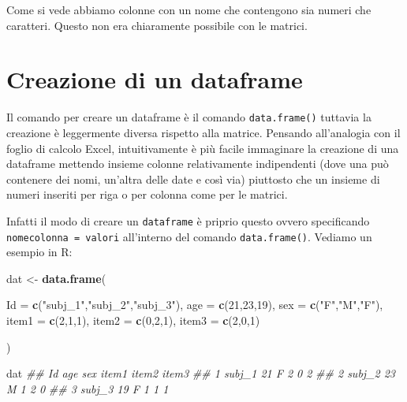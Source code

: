 \documentclass[
]{book}
\newenvironment{Shaded}{\begin{snugshade}}{\end{snugshade}}
\newcommand{\CommentTok}[1]{\textcolor[rgb]{0.56,0.35,0.01}{\textit{#1}}}
\newcommand{\DataTypeTok}[1]{\textcolor[rgb]{0.13,0.29,0.53}{#1}}
\newcommand{\DecValTok}[1]{\textcolor[rgb]{0.00,0.00,0.81}{#1}}
\newcommand{\KeywordTok}[1]{\textcolor[rgb]{0.13,0.29,0.53}{\textbf{#1}}}
\newcommand{\NormalTok}[1]{#1}
\newcommand{\StringTok}[1]{\textcolor[rgb]{0.31,0.60,0.02}{#1}}
\begin{document}
Come si vede abbiamo colonne con un nome che contengono sia numeri che caratteri. Questo non era chiaramente possibile con le matrici.

\hypertarget{creazione-di-un-dataframe}{%
\section{Creazione di un dataframe}\label{creazione-di-un-dataframe}}

Il comando per creare un dataframe è il comando \texttt{data.frame()} tuttavia la creazione è leggermente diversa rispetto alla matrice. Pensando all'analogia con il foglio di calcolo Excel, intuitivamente è più facile immaginare la creazione di una dataframe mettendo insieme colonne relativamente indipendenti (dove una può contenere dei nomi, un'altra delle date e così via) piuttosto che un insieme di numeri inseriti per riga o per colonna come per le matrici.

Infatti il modo di creare un \texttt{dataframe} è priprio questo ovvero specificando \texttt{nomecolonna\ =\ valori} all'interno del comando \texttt{data.frame()}. Vediamo un esempio in R:

\begin{Shaded}
\begin{Highlighting}[]

\NormalTok{dat <-}\StringTok{ }\KeywordTok{data.frame}\NormalTok{(}
  
  \DataTypeTok{Id =} \KeywordTok{c}\NormalTok{(}\StringTok{"subj_1"}\NormalTok{,}\StringTok{"subj_2"}\NormalTok{,}\StringTok{"subj_3"}\NormalTok{),}
  \DataTypeTok{age =} \KeywordTok{c}\NormalTok{(}\DecValTok{21}\NormalTok{,}\DecValTok{23}\NormalTok{,}\DecValTok{19}\NormalTok{),}
  \DataTypeTok{sex =} \KeywordTok{c}\NormalTok{(}\StringTok{"F"}\NormalTok{,}\StringTok{"M"}\NormalTok{,}\StringTok{"F"}\NormalTok{),}
  \DataTypeTok{item1 =} \KeywordTok{c}\NormalTok{(}\DecValTok{2}\NormalTok{,}\DecValTok{1}\NormalTok{,}\DecValTok{1}\NormalTok{),}
  \DataTypeTok{item2 =} \KeywordTok{c}\NormalTok{(}\DecValTok{0}\NormalTok{,}\DecValTok{2}\NormalTok{,}\DecValTok{1}\NormalTok{),}
  \DataTypeTok{item3 =} \KeywordTok{c}\NormalTok{(}\DecValTok{2}\NormalTok{,}\DecValTok{0}\NormalTok{,}\DecValTok{1}\NormalTok{)}
  
\NormalTok{)}

\NormalTok{dat}
\CommentTok{##       Id age sex item1 item2 item3}
\CommentTok{## 1 subj_1  21   F     2     0     2}
\CommentTok{## 2 subj_2  23   M     1     2     0}
\CommentTok{## 3 subj_3  19   F     1     1     1}
\end{Highlighting}
\end{Shaded}
\end{document}
